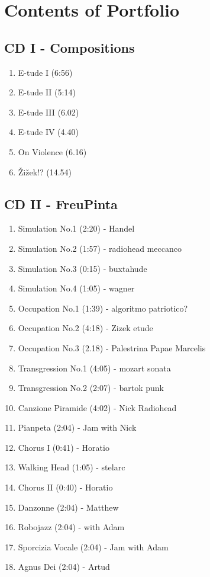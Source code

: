\chapter*{Contents of Portfolio}
\hypertarget{portfolio}{}

\section*{CD I - Compositions}

\begin{enumerate}
\item E-tude I (6:56)
\item E-tude II (5:14)
\item E-tude III (6.02)
\item E-tude IV (4.40)
\item On Violence (6.16)
\item \v{Z}i\v{z}ek!? (14.54)
\end{enumerate}

\section*{CD II - FreuPinta}

\begin{enumerate}
\item Simulation No.1 (2:20) - Handel
\item Simulation No.2 (1:57) - radiohead meccanco
\item Simulation No.3 (0:15) - buxtahude
\item Simulation No.4 (1:05) - wagner
\item Occupation No.1 (1:39) - algoritmo patriotico?
\item Occupation No.2 (4:18) - Zizek etude
\item Occupation No.3 (2.18) - Palestrina Papae Marcelis
\item Transgression No.1 (4:05) - mozart sonata
\item Transgression No.2 (2:07) - bartok punk
\item Canzione Piramide (4:02) - Nick Radiohead
\item Pianpeta (2:04) - Jam with Nick
\item Chorus I (0:41) - Horatio
\item Walking Head (1:05) - stelarc
\item Chorus II (0:40) - Horatio
\item Danzonne (2:04) - Matthew
\item Robojazz (2:04) - with Adam
\item Sporcizia Vocale (2:04) - Jam with Adam
\item Agnus Dei (2:04) - Artud

\end{enumerate}

